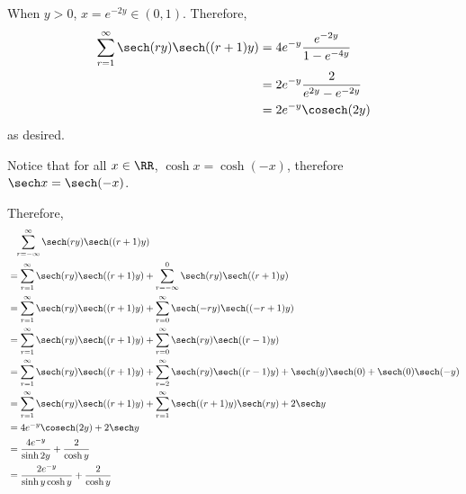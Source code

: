 \begin{enumerate}
          When \(y > 0\), \(x = e^{-2y} \in (0, 1)\). Therefore,
          \begin{align*}
              \sum_{r = 1}^{\infty} \sech (ry) \sech((r + 1)y) & = 4 e^{-y} \frac{e^{-2y}}{1 - e^{-4y}} \\
                                                               & = 2e^{-y} \frac{2}{e^{2y} - e^{-2y}}   \\
                                                               & = 2e^{-y} \cosech(2y)
          \end{align*}
          as desired.

          Notice that for all \(x \in \RR\), \(\cosh x = \cosh (-x)\), therefore \(\sech x = \sech (-x)\).

          Therefore,
          \begin{align*}
               & \phantom{=} \sum_{r = -\infty}^{\infty} \sech (ry) \sech((r + 1)y)                                                                           \\
               & = \sum_{r = 1}^{\infty} \sech (ry) \sech((r + 1)y) + \sum_{r = -\infty}^{0} \sech (ry) \sech((r + 1)y)                                       \\
               & = \sum_{r = 1}^{\infty} \sech (ry) \sech((r + 1)y) + \sum_{r = 0}^{\infty} \sech (-ry) \sech((-r+1)y)                                        \\
               & = \sum_{r = 1}^{\infty} \sech (ry) \sech((r + 1)y) + \sum_{r = 0}^{\infty} \sech (ry) \sech((r-1)y)                                          \\
               & = \sum_{r = 1}^{\infty} \sech (ry) \sech((r + 1)y) + \sum_{r = 2}^{\infty} \sech (ry) \sech((r-1)y) + \sech(y) \sech(0) + \sech(0) \sech(-y) \\
               & = \sum_{r = 1}^{\infty} \sech (ry) \sech((r + 1)y) + \sum_{r = 1}^{\infty} \sech ((r + 1)y) \sech(ry) + 2\sech y                             \\
               & = 4e^{-y} \cosech (2y) + 2 \sech y                                                                                                           \\
               & = \frac{4e^{-y}}{\sinh 2y} + \frac{2}{\cosh y}                                                                                               \\
               & = \frac{2e^{-y}}{\sinh y \cosh y} + \frac{2}{\cosh y}                                                                                        \\

\end{align*}
\end{enumerate}
